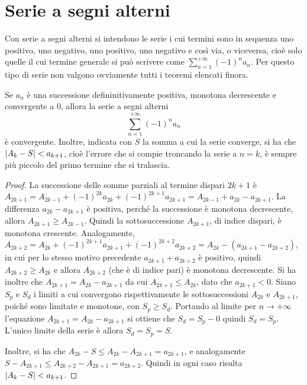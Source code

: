 \section{Serie a segni alterni}
Con serie a segni alterni si intendono le serie i cui termini sono in sequenza uno positivo, uno negativo, uno positivo, uno negativo e così via, o viceversa, cioè solo quelle il cui termine generale si può scrivere come $\sum_{n=1}^{+\infty}(-1)^na_n$. Per questo tipo di serie non valgono ovviamente tutti i teoremi elencati finora.
\begin{teorema}
\label{t:criterio_leibnitz}
Se $a_n$ è una successione defininitivamente positiva, monotona decrescente e convergente a 0, allora la serie a segni alterni
\[
\sum_{n=1}^{+\infty}(-1)^n a_n
\]
è convergente. Inoltre, indicata con $S$ la somma a cui la serie converge, si ha che $\lvert A_k-S\rvert<a_{k+1}$, cioè l'errore che si compie troncando la serie a $n=k$, è sempre più piccolo del primo termine che si tralascia.
\end{teorema}
\begin{proof}
La successione delle somme parziali al termine dispari $2k+1$ è $A_{2k+1}=A_{2k-1}+(-1)^{2k}a_{2k}+(-1)^{2k+1}a_{2k+1}=A_{2k-1}+a_{2k}-a_{2k+1}$. La differenza $a_{2k}-a_{2k+1}$ è positiva, perché la successione è monotona decrescente, allora $A_{2k+1}\geq A_{2k-1}$. Quindi la sottosuccessione $A_{2k+1}$, di indice dispari, è monotona crescente. Analogamente, $A_{2k+2}=A_{2k}+(-1)^{2k+1}a_{2k+1}+(-1)^{2k+2}a_{2k+2}=A_{2k}-(a_{2k+1}-a_{2k+2})$, in cui per lo stesso motivo precedente $a_{2k+1}+a_{2k+2}$ è positivo, quindi $A_{2k+2}\geq A_{2k}$ e allora $A_{2k+2}$ (che è di indice pari) è monotona decrescente.
Si ha inoltre che $A_{2k+1}=A_{2k}-a_{2k+1}$ da cui $A_{2k+1}\leq A_{2k}$, dato che $a_{2k+1}<0$. Siano $S_p$ e $S_d$ i limiti a cui convergono rispettivamente le sottosuccessioni $A_{2k}$ e $A_{2k+1}$, poiché sono limitate e monotone, con $S_p\geq S_d$. Portando al limite per $n\to+\infty$ l'equazione $A_{2k+1}=A_{2k}-a_{2k+1}$ si ottiene che $S_d=S_p-0$ quindi $S_d=S_p$. L'unico limite della serie è allora $S_d=S_p=S$.

Inoltre, si ha che $A_{2k}-S\leq A_{2k}-A_{2k+1}=a_{2k+1}$, e analogamente $S-A_{2k+1}\leq A_{2k+2}-A_{2k+1}=a_{2k+2}$. Quindi in ogni caso risulta $\lvert A_k-S\rvert<a_{k+1}$.
\end{proof}
